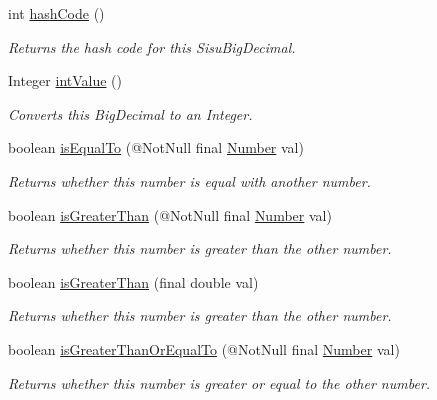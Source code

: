 \begin{DoxyCompactItemize}
int \hyperlink{interfacecom_1_1aarrelaakso_1_1drawl_1_1_number_a493e402b6856cded24d43022bd1b816a}{hash\+Code} ()
\begin{DoxyCompactList}\small\item\em Returns the hash code for this Sisu\+Big\+Decimal. \end{DoxyCompactList}\item 
Integer \hyperlink{interfacecom_1_1aarrelaakso_1_1drawl_1_1_number_a82bd01108e6f99cba2e83759fa363f39}{int\+Value} ()
\begin{DoxyCompactList}\small\item\em Converts this Big\+Decimal to an Integer. \end{DoxyCompactList}\item 
boolean \hyperlink{interfacecom_1_1aarrelaakso_1_1drawl_1_1_number_aa8ef6fc2e77da054f3a42f2cd81ec8a6}{is\+Equal\+To} (@Not\+Null final \hyperlink{interfacecom_1_1aarrelaakso_1_1drawl_1_1_number}{Number} val)
\begin{DoxyCompactList}\small\item\em Returns whether this number is equal with another number. \end{DoxyCompactList}\item 
boolean \hyperlink{interfacecom_1_1aarrelaakso_1_1drawl_1_1_number_a487be710eb911b7f3395014ee8cd4155}{is\+Greater\+Than} (@Not\+Null final \hyperlink{interfacecom_1_1aarrelaakso_1_1drawl_1_1_number}{Number} val)
\begin{DoxyCompactList}\small\item\em Returns whether this number is greater than the other number. \end{DoxyCompactList}\item 
boolean \hyperlink{interfacecom_1_1aarrelaakso_1_1drawl_1_1_number_ab3c02c742e083e6850ee6d2fe88e985b}{is\+Greater\+Than} (final double val)
\begin{DoxyCompactList}\small\item\em Returns whether this number is greater than the other number. \end{DoxyCompactList}\item 
boolean \hyperlink{interfacecom_1_1aarrelaakso_1_1drawl_1_1_number_a9c3df12a860251807827d670994b89a4}{is\+Greater\+Than\+Or\+Equal\+To} (@Not\+Null final \hyperlink{interfacecom_1_1aarrelaakso_1_1drawl_1_1_number}{Number} val)
\begin{DoxyCompactList}\small\item\em Returns whether this number is greater or equal to the other number. \end{DoxyCompactList}\item 

\end{DoxyCompactItemize}
